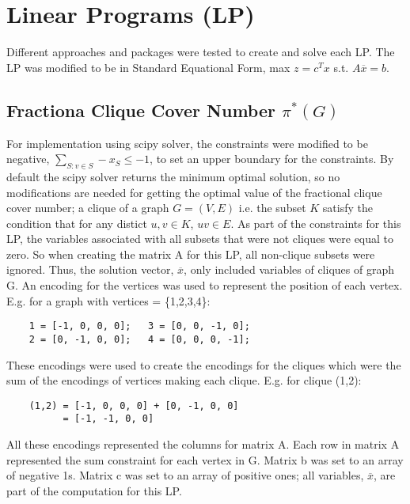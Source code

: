 \documentclass[11pt]{article}
\begin{document}
    \section*{Linear Programs (LP)}
    Different approaches and packages were tested to create and solve each LP. The LP was modified to be in Standard Equational Form,  max $z=c^Tx$ s.t. $A\overline{x}=b$. 
    \subsection*{Fractiona Clique Cover Number $\pi^*(G)$}
    For implementation using scipy solver, the constraints were modified to be negative, $\sum_{S:v\in S}  -x_S \le -1$, to set an upper boundary for the constraints. By default the scipy solver returns the minimum optimal solution, so no modifications are needed for getting the optimal value of the fractional clique cover number; a clique of a graph $G=(V,E)$ i.e. the subset $K$ satisfy the condition that for any distict $u,v \in K$, $uv \in E$. As part of the constraints for this LP, the variables associated with all subsets that were not cliques were equal to zero. So when creating the matrix A for this LP, all non-clique subsets were ignored. Thus, the solution vector, $\overline{x}$, only included variables of cliques of graph G. An encoding for the vertices was used to represent the position of each vertex. E.g. for a graph with vertices = \{1,2,3,4\}:
    \begin{lstlisting}
    1 = [-1, 0, 0, 0];   3 = [0, 0, -1, 0];
    2 = [0, -1, 0, 0];   4 = [0, 0, 0, -1];
    \end{lstlisting}
    These encodings were used to create the encodings for the cliques which were the sum of the encodings of vertices making each clique. E.g. for clique (1,2):
    \begin{lstlisting}
    (1,2) = [-1, 0, 0, 0] + [0, -1, 0, 0]
          = [-1, -1, 0, 0]
    \end{lstlisting}
    All these encodings represented the columns for matrix A. Each row in matrix A represented the sum constraint for each vertex in G. Matrix b was set to an array of negative 1s. Matrix c was set to an array of positive ones; all variables, $\overline{x}$, are part of the computation for this LP.  
\end{document}
